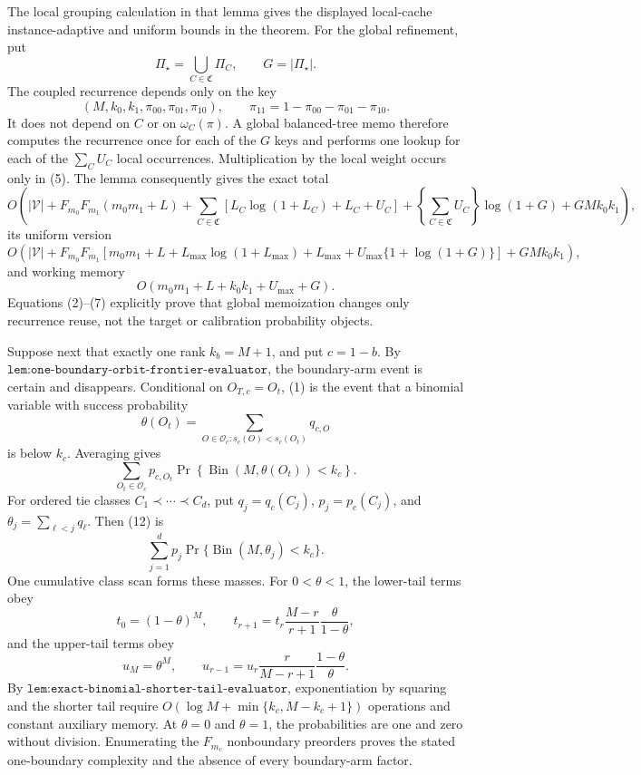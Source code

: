 The local grouping calculation in that lemma gives the displayed local-cache instance-adaptive and uniform bounds in the theorem. For the global refinement, put
\[
\Pi_\star=\bigcup_{C\in\mathfrak C}\Pi_C,\qquad G=|\Pi_\star|. \tag{6}
\]
The coupled recurrence depends only on the key
\[
(M,k_0,k_1,\pi_{00},\pi_{01},\pi_{10}),\qquad \pi_{11}=1-\pi_{00}-\pi_{01}-\pi_{10}. \tag{7}
\]
It does not depend on \(C\) or on \(\omega_C(\pi)\). A global balanced-tree memo therefore computes the recurrence once for each of the \(G\) keys and performs one lookup for each of the \(\sum_CU_C\) local occurrences. Multiplication by the local weight occurs only in (5). The lemma consequently gives the exact total
\[
O\!\left(
|\mathcal V|+F_{m_0}F_{m_1}(m_0m_1+L)+\sum_{C\in\mathfrak C}\left[L_C\log(1+L_C)+L_C+U_C\right]+\left\{\sum_{C\in\mathfrak C}U_C\right\}\log(1+G)+GMk_0k_1
\right), \tag{8}
\]
its uniform version
\[
O\!\left(|\mathcal V|+F_{m_0}F_{m_1}\left[m_0m_1+L+L_{\max}\log(1+L_{\max})+L_{\max}+U_{\max}\{1+\log(1+G)\}\right]+GMk_0k_1\right), \tag{9}
\]
and working memory
\[
O(m_0m_1+L+k_0k_1+U_{\max}+G). \tag{10}
\]
Equations (2)--(7) explicitly prove that global memoization changes only recurrence reuse, not the target or calibration probability objects.

Suppose next that exactly one rank \(k_b=M+1\), and put \(c=1-b\). By \(\texttt{lem:one-boundary-orbit-frontier-evaluator}\), the boundary-arm event is certain and disappears. Conditional on \(O_{T,c}=O_t\), (1) is the event that a binomial variable with success probability
\[
\theta(O_t)=\sum_{O\in\mathcal O_c:s_c(O)<s_c(O_t)}q_{c,O} \tag{11}
\]
is below \(k_c\). Averaging gives
\[
\sum_{O_t\in\mathcal O_c}p_{c,O_t}\Pr\!\left\{\operatorname{Bin}(M,\theta(O_t))<k_c\right\}. \tag{12}
\]
For ordered tie classes \(C_1\prec\cdots\prec C_d\), put \(q_j=q_c(C_j)\), \(p_j=p_c(C_j)\), and \(\theta_j=\sum_{\ell<j}q_\ell\). Then (12) is
\[
\sum_{j=1}^d p_j\Pr\{\operatorname{Bin}(M,\theta_j)<k_c\}. \tag{13}
\]
One cumulative class scan forms these masses. For \(0<\theta<1\), the lower-tail terms obey
\[
t_0=(1-\theta)^M,\qquad t_{r+1}=t_r\frac{M-r}{r+1}\frac{\theta}{1-\theta}, \tag{14}
\]
and the upper-tail terms obey
\[
u_M=\theta^M,\qquad u_{r-1}=u_r\frac{r}{M-r+1}\frac{1-\theta}{\theta}. \tag{15}
\]
By \(\texttt{lem:exact-binomial-shorter-tail-evaluator}\), exponentiation by squaring and the shorter tail require \(O(\log M+\min\{k_c,M-k_c+1\})\) operations and constant auxiliary memory. At \(\theta=0\) and \(\theta=1\), the probabilities are one and zero without division. Enumerating the \(F_{m_c}\) nonboundary preorders proves the stated one-boundary complexity and the absence of every boundary-arm factor.

